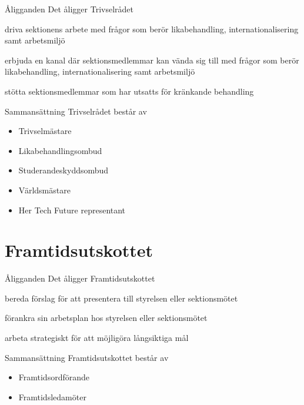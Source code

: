 \documentclass[pdfbookmarks,a4paper,11pt]{article}
\newlength{\itemcollength}
\newenvironment{reglemlista}{%
  \begin{list}{}{%
      \setlength{\labelwidth}{\itemcollength}%
      \setlength{\leftmargin}{\labelwidth + \labelsep}%
      \renewcommand{\makelabel}[1]{%
        \raisebox{0pt}[1ex][0pt]{%
          \makebox[\labelwidth][l]{%
            \parbox[t]{\itemcollength}{%
              \raggedright\hspace{0pt}##1}}}\hfill}%
      }}{%
  \end{list}}
\begin{document}
\begin{reglemlista}

	\item[Åligganden]
	Det åligger Trivselrådet
	\begin{attlista}
		\item driva sektionens arbete med frågor som berör likabehandling, internationalisering samt arbetsmiljö
		\item erbjuda en kanal där sektionsmedlemmar kan vända sig till med frågor som berör likabehandling, internationalisering samt arbetsmiljö
		\item stötta sektionsmedlemmar som har utsatts för kränkande behandling
	\end{attlista}
	\item[Sammansättning]
	Trivselrådet består av
	\begin{itemize}
		\item Trivselmästare
		\item Likabehandlingsombud
		\item Studerandeskyddsombud
		\item Världsmästare
		\item Her Tech Future representant
	\end{itemize}

\end{reglemlista}

\section{Framtidsutskottet}

\begin{reglemlista}

	\item[Åligganden]
	Det åligger Framtidsutskottet
	\begin{attlista}
		\item bereda förslag för att presentera till styrelsen eller sektionsmötet
		\item  förankra sin arbetsplan hos styrelsen eller sektionsmötet
		\item arbeta strategiskt för att möjligöra långsiktiga mål
	\end{attlista}
	\item[Sammansättning]
	Framtidsutskottet består av
	\begin{itemize}
		\item Framtidsordförande
		\item Framtidsledamöter
	\end{itemize}

\end{reglemlista}
\end{document}
